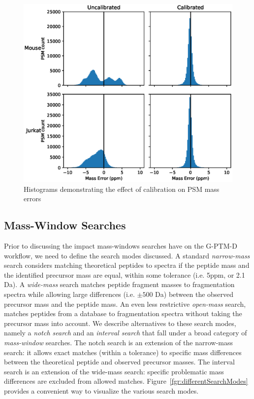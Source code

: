 \documentclass[journal=jprobs,manuscript=article]{achemso}
\begin{document}
\begin{figure}
  \includegraphics{fig2-calibrationQuality.eps}
  \caption{Histograms demonstrating the effect of calibration on PSM mass errors}
  \label{fgr:figure1}
\end{figure}

\newpage

\subsection{Mass-Window Searches}

Prior to discussing the impact mass-windows searches have on the G-PTM-D workflow, we need to define the search modes discussed. A standard \textit{narrow-mass} search considers matching theoretical peptides to spectra if the peptide mass and the identified precursor mass are equal, within some tolerance (i.e. 5ppm, or 2.1 Da).
A \textit{wide-mass} search matches peptide fragment masses to fragmentation spectra while allowing large differences (i.e. $\pm 500$ Da) between the observed precursor mass and the peptide mass.
An even less restrictive \textit{open-mass} search, matches peptides from a database to fragmentation spectra without taking the precursor mass into account.
We describe alternatives to these search modes, namely a \textit{notch search} and an \textit{interval search} that fall under a broad category of \textit{mass-window} searches.
The notch search is an extension of the narrow-mass search: it allows exact matches (within a tolerance) to specific mass differences between the theoretical peptide and observed precursor masses.
The interval search is an extension of the wide-mass search: specific problematic mass differences are excluded from allowed matches.
Figure~\ref{fgr:differentSearchModes} provides a convenient way to visualize the various search modes.
\end{document}
